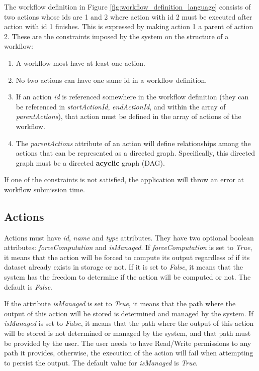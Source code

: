 The workflow definition in Figure \ref{fig:workflow_definition_language} consists of two actions whose ids are 1 and 2 where action with id 2 must be executed after action with id 1 finishes. This is expressed by making action 1 a parent of action 2. These are the constraints imposed by the system on the structure of a workflow:
\begin{enumerate}
\item A workflow most have at least one action.
\item No two actions can have one same id in a workflow definition.
\item If an action \textit{id} is referenced somewhere in the workflow definition (they can be referenced in \textit{startActionId}, \textit{endActionId}, and within the array of \textit{parentActions}), that action must be defined in the array of actions of the workflow.
\item The \textit{parentActions} attribute of an action will define relationships among the actions that can be represented as a directed graph. Specifically, this directed graph must be a directed \textbf{acyclic} graph (DAG).
\end{enumerate}

If one of the constraints is not satisfied, the application will throw an error at workflow submission time.

\subsection{Actions}
Actions must have \textit{id}, \textit{name} and \textit{type} attributes. They have two optional boolean attributes: \textit{forceComputation} and \textit{isManaged}. If \textit{forceComputation} is set to \textit{True}, it means that the action will be forced to compute its output regardless of if its dataset  already exists in storage or not. If it is set to \textit{False}, it means that the system has the freedom to determine if the action will be computed or not. The default is \textit{False}.

If the attribute \textit{isManaged} is set to \textit{True}, it means that the path where the output of this action will be stored is determined and managed by the system. If \textit{isManaged} is set to \textit{False}, it means that the path where the output of this action will be stored is not determined or managed by the system, and that path must be provided by the user. The user needs to have Read/Write permissions to any path it provides, otherwise, the execution of the action will fail when attempting to persist the output. The default value for \textit{isManaged} is \textit{True}.

